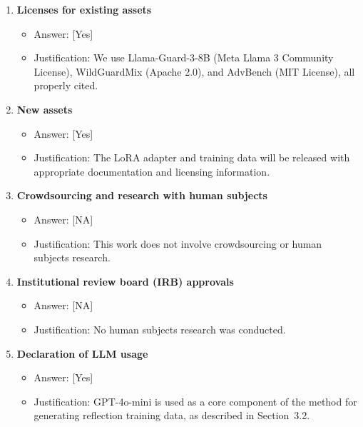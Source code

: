 \documentclass[11pt]{article}
\begin{document}
\begin{enumerate}[leftmargin=*]
\item \textbf{Licenses for existing assets}
\begin{itemize}
  \item[] Answer: [Yes]
  \item[] Justification: We use Llama-Guard-3-8B (Meta Llama 3 Community License), WildGuardMix (Apache 2.0), and AdvBench (MIT License), all properly cited.
\end{itemize}

\item \textbf{New assets}
\begin{itemize}
  \item[] Answer: [Yes]
  \item[] Justification: The LoRA adapter and training data will be released with appropriate documentation and licensing information.
\end{itemize}

\item \textbf{Crowdsourcing and research with human subjects}
\begin{itemize}
  \item[] Answer: [NA]
  \item[] Justification: This work does not involve crowdsourcing or human subjects research.
\end{itemize}

\item \textbf{Institutional review board (IRB) approvals}
\begin{itemize}
  \item[] Answer: [NA]
  \item[] Justification: No human subjects research was conducted.
\end{itemize}

\item \textbf{Declaration of LLM usage}
\begin{itemize}
  \item[] Answer: [Yes]
  \item[] Justification: GPT-4o-mini is used as a core component of the method for generating reflection training data, as described in Section~3.2.
\end{itemize}

\end{enumerate}

\end{document}
